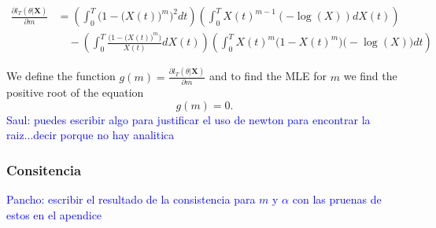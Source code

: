 \documentclass[12pt, reqno]{amsart}
\newcommand{\fer}[1]{{\textcolor{blue}{#1}}}
\newcommand*{\Scale}[2][4]{\scalebox{#1}{$#2$}}%
\newcommand{\1}{{\bf 1}}
\newcommand{\2}{{\bf 2}}
\newcommand{\lalo}[1]{{\textcolor{OliveGreen}{#1}}}
\theoremstyle{definition}
\theoremstyle{remark}
\numberwithin{equation}{section}
\begin{document}
 

   \begin{align}
  \frac{\partial l_T(\theta|\bm X)}{\partial m}&=   \left( \int_0^T  \big(1-\big(X(t)\big)^m\big)^2   dt\right) \left(\int_0^T   X(t)^{m-1} (-\log(X))  dX(t)\right)\nonumber \\
 & \quad -   \left( \int_0^T \frac{ \big(1-\big(X(t)\big)^m\big)  }{X(t)}  dX(t)  \right) \left( \int_0^T  X(t)^{m} \big(1-X(t)^m\big) \big(-\log(X) \big) dt   \right) \label{MLE-m} 
 \end{align}

We define the function $g(m)= \frac{\partial l_T(\theta|\bm X)}{\partial m}$ and to find the MLE for $m$ we find the positive root of the equation   
\begin{equation}\label{eq:m}
 g(m)=0.   
\end{equation}
\fer{Saul: puedes escribir algo para justificar el uso de  newton para encontrar la raiz...decir porque no hay analitica}


\subsubsection{Consitencia}
\fer{ Pancho: escribir el resultado de la consistencia para $m$ y $\alpha$ con las pruenas de estos en el apendice}\\
\end{document}
